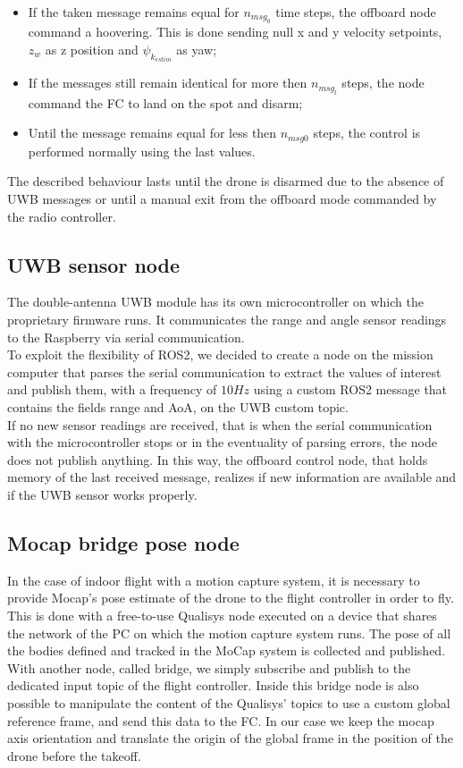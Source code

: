 \begin{itemize}
    \begin{itemize}
        \item If the taken message remains equal for $n_{msg_{0}}$ time steps, the offboard node command a hoovering. This is done sending null x and y velocity setpoints, $z_{w}$ as z position and $\psi_{k_{estim}}$ as yaw;
        \item If the messages still remain identical for more then $n_{msg_{l}}$ steps, the node command the FC to land on the spot and disarm;
        \item Until the message remains equal for less then $n_{msg{0}}$ steps, the control is performed normally using the last values.
    \end{itemize}
    The described behaviour lasts until the drone is disarmed due to the absence of UWB messages or until a manual exit from the offboard mode commanded by the radio controller.
\end{itemize}

\subsection{UWB sensor node}
The double-antenna UWB module has its own microcontroller on which the proprietary firmware runs. It communicates the range and angle sensor readings to the Raspberry via serial communication.\\
To exploit the flexibility of ROS2, we decided to create a node on the mission computer that parses the serial communication to extract the values of interest and publish them, with a frequency of $10 Hz$ using a custom ROS2 message that contains the fields range and AoA, on the UWB custom topic.\\
If no new sensor readings are received, that is when the serial communication with the microcontroller stops or in the eventuality of parsing errors, the node does not publish anything. In this way, the offboard control node, that holds memory of the last received message, realizes if new information are available and if the UWB sensor works properly.  

\subsection{Mocap bridge pose node} \label{Mocap details}
In the case of indoor flight with a motion capture system, it is necessary to provide Mocap's pose estimate of the drone to the flight controller in order to fly. This is done with a free-to-use Qualisys node \cite{qualisysros} executed on a device that shares the network of the PC on which the motion capture system runs. The pose of all the bodies defined and tracked in the MoCap system is collected and published.\\
With another node, called bridge, we simply subscribe and publish to the dedicated input topic of the flight controller. Inside this bridge node is also possible to manipulate the content of the Qualisys' topics to use a custom global reference frame, and send this data to the FC. In our case we keep the mocap axis orientation and translate the origin of the global frame in the position of the drone before the takeoff.